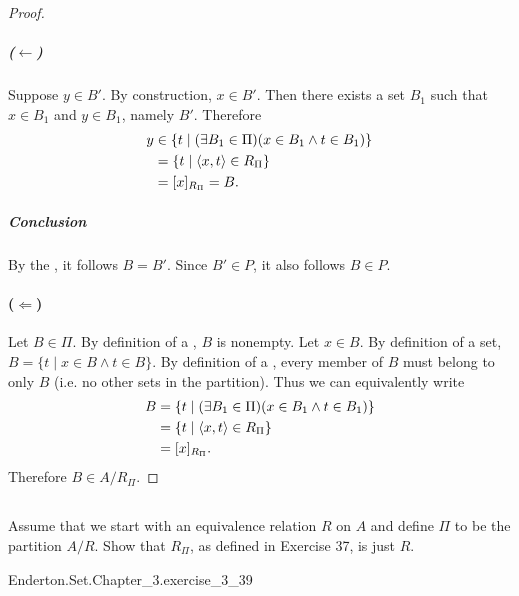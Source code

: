 \documentclass{report}
\begin{document}
\begin{proof}
      \subparagraph{($\leftarrow$)}%

        Suppose $y \in B'$.
        By construction, $x \in B'$.
        Then there exists a set $B_1$ such that $x \in B_1$ and $y \in B_1$,
          namely $B'$.
        Therefore
          \begin{align*}
            y
              & \in \{t \mid (\exists B_1 \in \Pi)(x \in B_1 \land t \in B_1)\} \\
              & = \{t \mid \left< x, t \right> \in R_\Pi\} \\
              & = [x]_{R_\Pi} = B.
          \end{align*}

      \subparagraph{Conclusion}%

        By the , it follows $B = B'$.
        Since $B' \in P$, it also follows $B \in P$.

    \paragraph{($\Leftarrow$)}%

      Let $B \in \Pi$.
      By definition of a , $B$ is nonempty.
      Let $x \in B$.
      By definition of a set, $B = \{t \mid x \in B \land t \in B\}$.
      By definition of a , every member of $B$ must
        belong to only $B$ (i.e. no other sets in the partition).
      Thus we can equivalently write
        \begin{align*}
          B
            & = \{t \mid (\exists B_1 \in \Pi)(x \in B_1 \land t \in B_1)\} \\
            & = \{ t \mid \left< x, t \right> \in R_\Pi \} \\
            & = [x]_{R_\Pi}.
        \end{align*}
      Therefore $B \in A / R_{\Pi}$.

  \end{proof}

\subsection{}%

  Assume that we start with an equivalence relation $R$ on $A$ and define $\Pi$
    to be the partition $A / R$.
  Show that $R_\Pi$, as defined in Exercise 37, is just $R$.

    {Enderton.Set.Chapter\_3.exercise\_3\_39}
\end{document}
